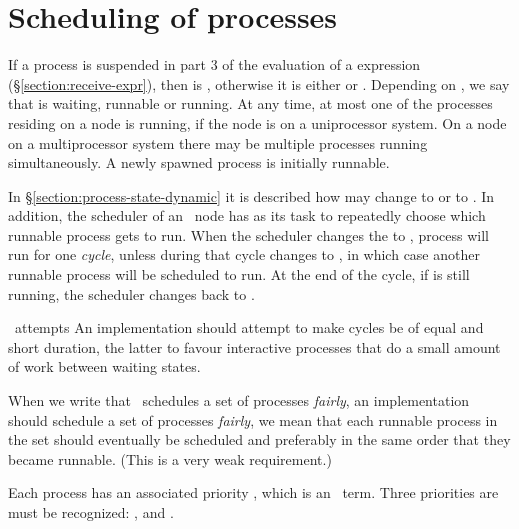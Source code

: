 \section{Scheduling of processes}

\label{section:scheduling}

If a process  is suspended in part 3 of the evaluation of a
 expression
(\S\ref{section:receive-expr}), then  is
,
otherwise it is either 
or .
Depending on , we say that
 is waiting, runnable or running.
At any time, at most one of the processes residing on a node
is running, if the node is on a uniprocessor system.  On a node on a
multiprocessor system there may be multiple processes running simultaneously.
A newly spawned process is initially runnable.

In \S\ref{section:process-state-dynamic} it is described how  may change
to  or to .  In addition, the scheduler of an \Erlang\ node
has as its task to repeatedly choose which runnable process gets to run.
When the
scheduler changes the  to , process  will run for
one \emph{cycle}, unless during that cycle  changes to ,
in which case another runnable process will be scheduled to run.  At the end of the
cycle, if  is still running, the scheduler changes  back to .

\ifOld \OldErlang\ attempts \fi
\ifNew An implementation should attempt \fi
to make cycles be of equal and short duration, the latter to favour interactive
processes that do a small amount of work between waiting states.

When we write that
\ifOld \OldErlang\ schedules a set of processes \emph{fairly}, \fi
\ifNew an implementation should schedule a set of processes \emph{fairly}, \fi
we mean that each runnable process in the set should eventually be scheduled and preferably
in the same order that they became runnable.  (This is a very weak requirement.)

Each process  has an associated priority , which
is an \Erlang\ term. Three priorities
\ifOld are \fi
\ifNew must be \fi
recognized: ,  and .

